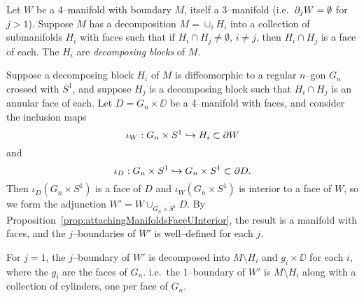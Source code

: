 \begin{ex}
	Let $W$ be a 4--manifold with boundary $M$, itself a 3--manifold  (i.e.\ $ \partial_j W =\emptyset$ for $j>1$).
	Suppose $M$ has a decomposition $M=\cup_i H_i$ into a collection of submanifolds $H_i$ with faces such that if $H_i\cap H_j\neq\emptyset$, $i\neq j$, then $H_i\cap H_j$ is a face of each.
	The $H_i$ are \emph{decomposing blocks} of $M$.
	
	Suppose a decomposing block $H_i$ of $M$ is diffeomorphic to a regular $n$--gon $G_n$ crossed with $S^1$, and suppose $H_j$ is a decomposing block such that $H_i\cap H_j$ is an annular face of each.
	Let $D=G_n\times\DD$ be a 4--manifold with faces, and consider the inclusion maps
	\[
		\iota_W:G_n\times S^1\hookrightarrow H_i\subset \partial W 
	\]
	and
	\[
		\iota_D:G_n\times S^1\hookrightarrow G_n\times S^1\subset \partial D.
	\]
	Then $\iota_D(G_n\times S^1)$ is a face of $D$ and $\iota_W(G_n\times S^1)$ is interior to a face of $W$, so we form the adjunction $W'=W\cup_{G_n\times S^1} D$.
	By Proposition~\ref{prop:attachingManifoldsFaceUInterior}, the result is a manifold with faces, and the $j$--boundaries of $W'$ is well--defined for each $j$.
	
	For $j=1$, the $j$--boundary of $W'$ is decomposed into $M\setminus H_i$ and $g_i\times \DD$ for each $i$, where the $g_i$ are the faces of $G_n$.
	i.e.\ the $1$--boundary of $W'$ is $M\setminus H_i$ along with a collection of cylinders, one per face of $G_n$.
\end{ex}


